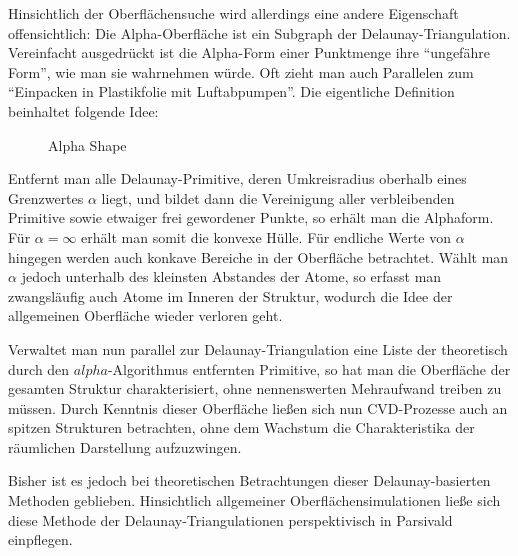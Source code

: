 Hinsichtlich der Oberflächensuche wird allerdings eine andere Eigenschaft offensichtlich:
Die Alpha-Oberfläche ist ein Subgraph der Delaunay-Triangulation.
Vereinfacht ausgedrückt ist die Alpha-Form einer Punktmenge ihre ``ungefähre Form'', wie man sie wahrnehmen würde.
Oft zieht man auch Parallelen zum ``Einpacken in Plastikfolie mit Luftabpumpen''.
Die eigentliche Definition beinhaltet folgende Idee:

\begin{figure}[bhpt]
  \centering
  \def\svgwidth{\textwidth}
  
  \caption[Alpha Shape]{Alpha Shape}
  \label{fig:delaunay-alpha}
\end{figure}

Entfernt man alle Delaunay-Primitive, deren Umkreisradius oberhalb eines Grenzwertes $\alpha$ liegt, und bildet dann die Vereinigung aller verbleibenden Primitive sowie etwaiger frei gewordener Punkte, so erhält man die Alphaform.
Für $\alpha = \infty$ erhält man somit die konvexe Hülle.
Für endliche Werte von $\alpha$ hingegen werden auch konkave Bereiche in der Oberfläche betrachtet.
Wählt man $\alpha$ jedoch unterhalb des kleinsten Abstandes der Atome, so erfasst man zwangsläufig auch Atome im Inneren der Struktur, wodurch die Idee der allgemeinen Oberfläche wieder verloren geht.

Verwaltet man nun parallel zur Delaunay-Triangulation eine Liste der theoretisch durch den $alpha$-Algorithmus entfernten Primitive, so hat man die Oberfläche der gesamten Struktur charakterisiert, ohne nennenswerten Mehraufwand treiben zu müssen.
Durch Kenntnis dieser Oberfläche ließen sich nun CVD-Prozesse auch an spitzen Strukturen betrachten, ohne dem Wachstum die Charakteristika der räumlichen Darstellung aufzuzwingen.

Bisher ist es jedoch bei theoretischen Betrachtungen dieser Delaunay-basierten Methoden geblieben.
Hinsichtlich allgemeiner Oberflächensimulationen ließe sich diese Methode der Delaunay-Triangulationen perspektivisch in Parsivald einpflegen.
